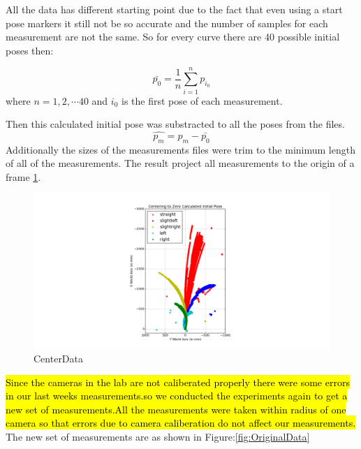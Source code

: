 \documentclass[10pt]{scrartcl}
\begin{document}
All the data has different starting point due to the fact that even using a start pose markers it still not be so accurate and the number of samples for each measurement are not the same. So for every curve there are 40 possible initial poses then:

\[	
	\bar{p_0} = \frac{1}{n} \sum_{i=1}^{n} p_{i_0}
\]
where $n = 1,2,\cdots 40$ and $i_0$ is the first pose of each measurement.

Then this calculated initial pose was substracted to all the poses from the files.
\[	
	\hat{p_m} = p_m - \bar{p_0}
\]
Additionally the sizes of the measurements files were trim to the minimum length of all of the measurements. The result project all measurements to the origin of a frame \ref{fig:preprocess}.

\begin{figure}[ht!]
\centering
\includegraphics[trim={220 0 0 0},clip,scale=0.5]{images/centerMeasurements}
\caption{CenterData}
\label{fig:preprocess}
\end{figure}

\hl{Since the cameras in the lab are not caliberated properly there were some errors in our last weeks measurements.so we conducted the experiments again to get a new set of measurements.All the measurements were taken within radius of one camera so that errors due to camera caliberation do not affect our measurements. }
The new set of measurements are as shown in Figure:\ref{fig:OriginalData}
\end{document}
